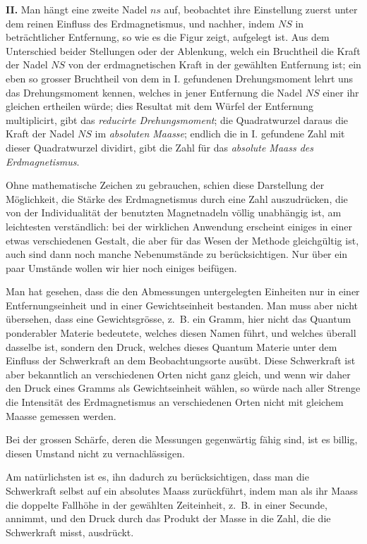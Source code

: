 \documentclass[12pt,a4paper]{article}
\begin{document}
\textbf{II.} Man hängt eine zweite Nadel $ns$ auf, beobachtet ihre Einstellung zuerst unter dem reinen Einfluss des Erdmagnetismus, und nachher, indem $NS$ in beträchtlicher Entfernung, so wie es die Figur zeigt, aufgelegt ist. Aus dem Unterschied beider Stellungen oder der Ablenkung, welch ein Bruchtheil die Kraft der Nadel $NS$ von der erdmagnetischen Kraft in der gewählten Entfernung ist; ein eben so grosser Bruchtheil von dem in I. gefundenen Drehungsmoment lehrt uns das Drehungsmoment kennen, welches in jener Entfernung die Nadel $NS$ einer ihr gleichen ertheilen würde; dies Resultat mit dem Würfel der Entfernung multiplicirt, gibt das \textit{reducirte Drehungsmoment}; die Quadratwurzel daraus die Kraft der Nadel $NS$ im \textit{absoluten Maasse}; endlich die in I. gefundene Zahl mit dieser Quadratwurzel dividirt, gibt die Zahl für das \textit{absolute Maass des Erdmagnetismus}.

\bigskip

Ohne mathematische Zeichen zu gebrauchen, schien diese Darstellung der Möglichkeit, die Stärke des Erdmagnetismus durch eine Zahl auszudrücken, die von der Individualität der benutzten Magnetnadeln völlig unabhängig ist, am leichtesten verständlich: bei der wirklichen Anwendung erscheint einiges in einer etwas verschiedenen Gestalt, die aber für das Wesen der Methode gleichgültig ist, auch sind dann noch manche Nebenumstände zu berücksichtigen. Nur über ein paar Umstände wollen wir hier noch einiges beifügen.

Man hat gesehen, dass die den Abmessungen untergelegten Einheiten nur in einer Entfernungseinheit und in einer Gewichtseinheit bestanden. Man muss aber nicht übersehen, dass eine Gewichtsgrösse, z.~B. ein Gramm, hier nicht das Quantum ponderabler Materie bedeutete, welches diesen Namen führt, und welches überall dasselbe ist, sondern den Druck, welches dieses Quantum Materie unter dem Einfluss der Schwerkraft an dem Beobachtungsorte ausübt. Diese Schwerkraft ist aber bekanntlich an verschiedenen Orten nicht ganz gleich, und wenn wir daher den Druck eines Gramms als Gewichtseinheit wählen, so würde nach aller Strenge die Intensität des Erdmagnetismus an verschiedenen Orten nicht mit gleichem Maasse gemessen werden.

Bei der grossen Schärfe, deren die Messungen gegenwärtig fähig sind, ist es billig, diesen Umstand nicht zu vernachlässigen.

Am natürlichsten ist es, ihn dadurch zu berücksichtigen, dass man die Schwerkraft selbst auf ein absolutes Maass zurückführt, indem man als ihr Maass die doppelte Fallhöhe in der gewählten Zeiteinheit, z.~B. in einer Secunde, annimmt, und den Druck durch das Produkt der Masse in die Zahl, die die Schwerkraft misst, ausdrückt.
\end{document}
